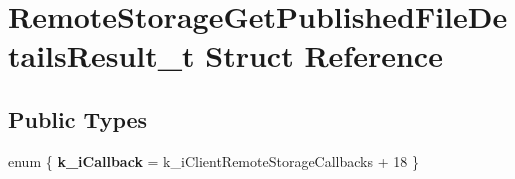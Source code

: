 \hypertarget{structRemoteStorageGetPublishedFileDetailsResult__t}{}\section{Remote\+Storage\+Get\+Published\+File\+Details\+Result\+\_\+t Struct Reference}
\label{structRemoteStorageGetPublishedFileDetailsResult__t}
\subsection*{Public Types}
\begin{DoxyCompactItemize}
\item 
\hypertarget{structRemoteStorageGetPublishedFileDetailsResult__t_a320dae5a1372dd6a5774746a54871afe}{}enum \{ {\bfseries k\+\_\+i\+Callback} = k\+\_\+i\+Client\+Remote\+Storage\+Callbacks + 18
 \}\label{structRemoteStorageGetPublishedFileDetailsResult__t_a320dae5a1372dd6a5774746a54871afe}

\end{DoxyCompactItemize}
